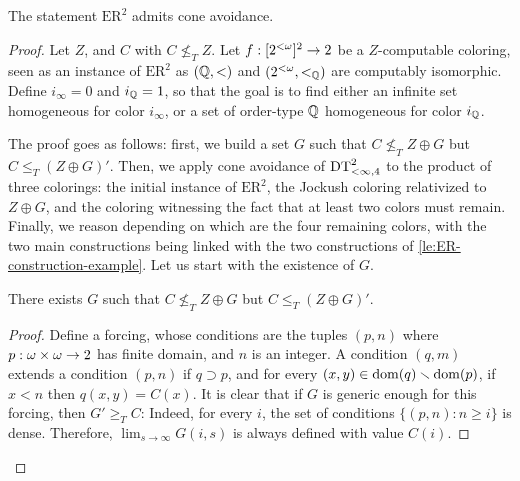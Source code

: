 \begin{theorem}
  The statement $\mathrm{ER}^2$ admits cone avoidance.
\end{theorem}
\begin{proof}
  \newcommand\ER{\mathrm{ER}}
  \newcommand\femb{f_{<_\Qb}}
  \newcommand\iemb{{i_{<_\Qb}}}
  \renewcommand\ltlex{<_\Qb}
  Let $Z$, and $C$ with $C\not\leq_T Z$. Let $f: [{2^{<\omega}}]^2\to 2$ be a $Z$-computable coloring, seen as an instance of $\ER^2$ as $(\mathbb{Q},<)$ and $(\cantor,\ltlex)$ are computably isomorphic. Define $i_\infty=0$ and $i_{\mathbb{Q}}=1$, so that the goal is to find either an infinite set homogeneous for color $i_\infty$, or a set of order-type $\mathbb{Q}$ homogeneous for color $i_{\mathbb{Q}}$.

  The proof goes as follows: first, we build a set $G$ such that $C\not\leq_TZ\oplus G$ but $C\leq_T(Z\oplus G)'$. Then, we apply cone avoidance of $\mathrm{DT}^{2}_{<\infty, 4}$ to the product of three colorings: the initial instance of $\ER^2$, the Jockush coloring relativized to $Z\oplus G$, and the coloring witnessing the fact that at least two colors must remain. Finally, we reason depending on which are the four remaining colors, with the two main constructions being linked with the two constructions of \cref{le:ER-construction-example}. Let us start with the existence of $G$. %

  \begin{claim}
    There exists $G$ such that  $C\not\leq_TZ\oplus G$ but $C\leq_T(Z\oplus G)'$.
  \end{claim}
  \begin{proof}
  Define a forcing, whose conditions are the tuples $(p,n)$ where $p:\omega\times\omega\to 2$ has finite domain, and $n$ is an integer. A condition $(q,m)$ extends a condition $(p,n)$ if $q\supset p$, and for every $(x,y)\in\mathrm{dom}(q)\smallsetminus\mathrm{dom}(p)$, if $x<n$ then $q(x,y)=C(x)$. It is clear that if $G$ is generic enough for this forcing, then $G'\geq_T C$: Indeed, for every $i$, the set of conditions $\{(p,n):n\geq i\}$ is dense. Therefore, $\lim_{s\to\infty}G(i,s)$ is always defined with value $C(i)$.


\end{proof}
\end{proof}
